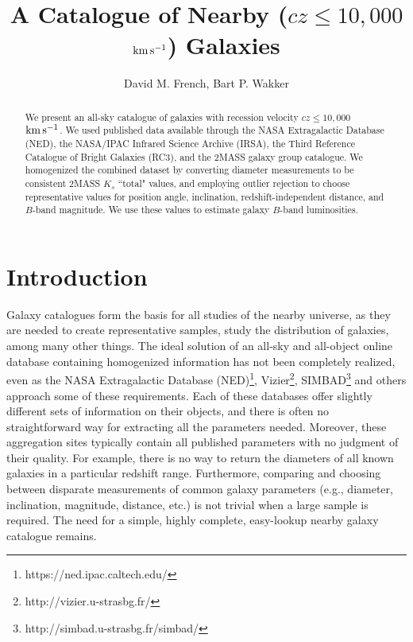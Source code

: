\documentclass[twocolumn,tighten]{aastex62}
\newcommand{\kms}{$\rm km\, s^{-1}$}
\begin{document}
\title{A Catalogue of Nearby ($cz \leq 10,000$ \kms) Galaxies}

\author{David M. French, Bart P. Wakker}


\begin{abstract}
We present an all-sky catalogue of galaxies with recession velocity $cz \leq 10,000$ \kms. We used published data available through the NASA Extragalactic Database (NED), the NASA/IPAC Infrared Science Archive (IRSA), the Third Reference Catalogue of Bright Galaxies (RC3), and the \cite{tully2015} 2MASS galaxy group catalogue. We homogenized the combined dataset by converting diameter measurements to be consistent 2MASS $K_s$ ``total" values, and employing outlier rejection to choose representative values for position angle, inclination, redshift-independent distance, and $B$-band magnitude. We use these values to estimate galaxy $B$-band luminosities.


\end{abstract}

\cleardoublepage



\section{Introduction}

Galaxy catalogues form the basis for all studies of the nearby universe, as they are needed to create representative samples, study the distribution of galaxies, among many other things. The ideal solution of an all-sky and all-object online database containing homogenized information has not been completely realized, even as the NASA Extragalactic Database (NED)\footnote{https://ned.ipac.caltech.edu/}, Vizier\footnote{http://vizier.u-strasbg.fr/}, SIMBAD\footnote{http://simbad.u-strasbg.fr/simbad/} and others approach some of these requirements. Each of these databases offer slightly different sets of information on their objects, and there is often no straightforward way for extracting all the parameters needed. Moreover, these aggregation sites typically contain all published parameters with no judgment of their quality. For example, there is no way to return the diameters of all known galaxies in a particular redshift range. Furthermore, comparing and choosing between disparate measurements of common galaxy parameters (e.g., diameter, inclination, magnitude, distance, etc.) is not trivial when a large sample is required. The need for a simple, highly complete, easy-lookup nearby galaxy catalogue remains.
\end{document}
